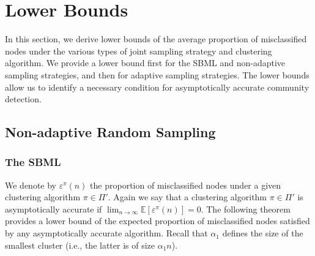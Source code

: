 \documentclass[12pt]{colt}%
\begin{document}

\section{Lower Bounds}

In this section, we derive lower bounds of the average proportion of misclassified nodes under the various types of joint sampling strategy and clustering algorithm. We provide a lower bound first for the SBML and non-adaptive sampling strategies, and then for adaptive sampling strategies. The lower bounds allow us to identify a necessary condition for asymptotically accurate community detection.

\subsection{Non-adaptive Random Sampling}

\subsubsection{The SBML}

We denote by $\varepsilon^\pi(n)$ the proportion of misclassified nodes under a given clustering algorithm $\pi\in \Pi'$. Again we say that a clustering algorithm $\pi\in \Pi'$ is asymptotically accurate if $\lim_{n\to\infty} \mathbb{E}[\varepsilon^\pi(n)]=0$.  The following theorem provides a lower bound of the expected proportion of misclassified nodes satisfied by any asymptotically accurate algorithm. Recall that $\alpha_1$ defines the size of the smallest cluster (i.e., the latter is of size $\alpha_1 n$).
\end{document}
